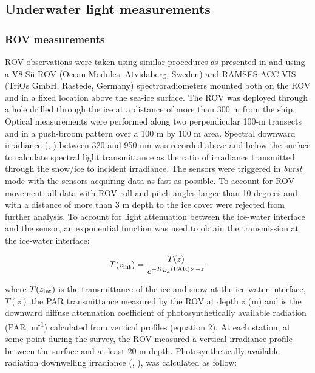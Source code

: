 \subsection{Underwater light measurements}

\subsubsection{ROV measurements}

ROV observations were taken using similar procedures as presented in \citet{Nicolaus2013} and \citet{Katlein2017} using a V8 Sii ROV (Ocean Modules, Atvidaberg, Sweden) and RAMSES-ACC-VIS (TriOs GmbH, Rastede, Germany) spectroradiometers mounted both on the ROV and in a fixed location above the sea-ice surface. The ROV was deployed through a hole drilled through the ice at a distance of more than 300 m from the ship. Optical measurements were performed along two perpendicular 100-m transects and in a push-broom pattern over a 100 m by 100 m area. Spectral downward irradiance (\ed{}, \wmsquare) between 320 and 950 nm was recorded above and below the surface to calculate spectral light transmittance as the ratio of irradiance transmitted through the snow/ice to incident irradiance. The sensors were triggered in \textit{burst} mode with the sensors acquiring data as fast as possible. To account for ROV movement, all data with ROV roll and pitch angles larger than 10 degrees and with a distance of more than 3 m depth to the ice cover were rejected from further analysis. To account for light attenuation between the ice-water interface and the sensor, an exponential function was used to obtain the transmission at the ice-water interface:

\begin{linenomath*}
	\begin{equation}
		T(z_\textnormal{int}) = \frac{T(z)}{e^{-K_{E_d}(\textnormal{PAR}){} \times -z}}
	\end{equation}
\end{linenomath*}

\noindent where $T(z_\textnormal{int})$ is the transmittance of the ice and snow at the ice-water interface, $T(z)$ the PAR transmittance measured by the ROV at depth $z$ (m) and \kdpar{} is the downward diffuse attenuation coefficient of photosynthetically available radiation (PAR; m\textsuperscript{-1}) calculated from \epar{} vertical profiles (equation 2). At each station, at some point during the survey, the ROV measured a vertical irradiance profile between the surface and at least 20 m depth. Photosynthetically available radiation downwelling irradiance (\eparz{}, \micromol{}), was calculated as follow:

